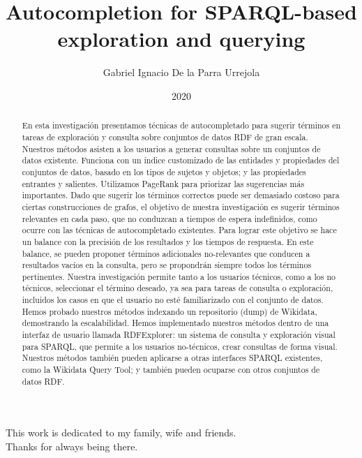 \documentclass[upright, contnum]{umemoria}
\author{Gabriel Ignacio De la Parra Urrejola}
\title{Autocompletion for SPARQL-based exploration and querying}
\date{2020}
\begin{document}
\frontmatter
\maketitle

\begin{abstract}
En esta investigación presentamos técnicas de autocompletado para sugerir términos en tareas de exploración y consulta sobre conjuntos de datos RDF de gran escala. 
Nuestros métodos asisten a los usuarios a generar consultas sobre un conjuntos de datos existente.
Funciona con un índice customizado de las entidades y propiedades del conjuntos de datos, basado en los tipos de sujetos y objetos; y las propiedades entrantes y salientes.
Utilizamos PageRank para priorizar las sugerencias más importantes. 
Dado que sugerir los términos correctos puede ser demasiado costoso para ciertas construcciones de grafos, el objetivo de nuestra investigación es sugerir términos relevantes en cada paso, que no conduzcan a tiempos de espera indefinidos, como ocurre con las técnicas de autocompletado existentes.
Para lograr este objetivo se hace un balance con la precisión de los resultados y los tiempos de respuesta. 
En este balance, se pueden proponer términos adicionales no-relevantes que conducen a resultados vacíos en la consulta, pero se propondrán siempre todos los términos pertinentes.
Nuestra investigación permite tanto a los usuarios técnicos, como a los no técnicos, seleccionar el término deseado, ya sea para tareas de consulta o exploración, incluidos los casos en que el usuario no esté familiarizado con el conjunto de datos.
Hemos probado nuestros métodos indexando un repositorio (dump) de Wikidata, demostrando la escalabilidad. 
Hemos implementado nuestros métodos dentro de una interfaz de usuario llamada RDFExplorer: un sistema de consulta y exploración visual para SPARQL, que permite a los usuarios no-técnicos, crear consultas de forma visual. 
Nuestros métodos también pueden aplicarse a otras interfaces SPARQL existentes, como la Wikidata Query Tool; y también pueden ocuparse con otros conjuntos de datos RDF.
\end{abstract}

\begin{dedicatoria} %
This work is dedicated to my family, wife and friends.\\
Thanks for always being there.
\end{dedicatoria}


\cleardoublepage

\tableofcontents
\listoftables %
\listoffigures %

\mainmatter














\end{document}
